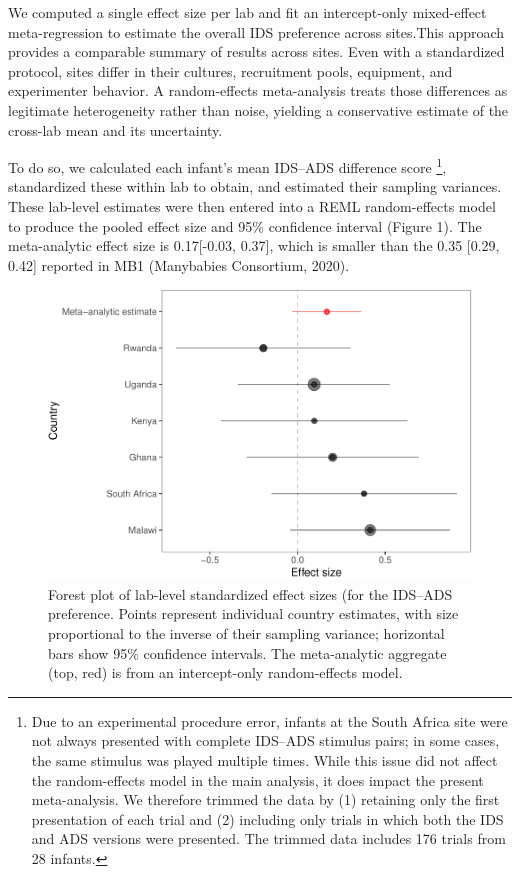 \documentclass[
  ,man,floatsintext]{apa6}
\begin{document}
We computed a single effect size per lab and fit an intercept-only mixed-effect meta-regression to estimate the overall IDS preference across sites.This approach provides a comparable summary of results across sites. Even with a standardized protocol, sites differ in their cultures, recruitment pools, equipment, and experimenter behavior. A random-effects meta-analysis treats those differences as legitimate heterogeneity rather than noise, yielding a conservative estimate of the cross-lab mean and its uncertainty.

To do so, we calculated each infant's mean IDS--ADS difference score \footnote{ Due to an experimental procedure error, infants at the South Africa site were not always presented with complete IDS--ADS stimulus pairs; in some cases, the same stimulus was played multiple times. While this issue did not affect the random-effects model in the main analysis, it does impact the present meta-analysis. We therefore trimmed the data by (1) retaining only the first presentation of each trial and (2) including only trials in which both the IDS and ADS versions were presented. The trimmed data includes 176 trials from 28 infants.}, standardized these within lab to obtain, and estimated their sampling variances. These lab-level estimates were then entered into a REML random-effects model to produce the pooled effect size and 95\% confidence interval (Figure 1). The meta-analytic effect size is 0.17{[}-0.03, 0.37{]}, which is smaller than the 0.35 {[}0.29, 0.42{]} reported in MB1 (Manybabies Consortium, 2020).

\begin{figure}
\centering
\includegraphics{mb1a-paper_files/figure-latex/unnamed-chunk-28-1.pdf}
\caption{\label{fig:unnamed-chunk-28}Forest plot of lab-level standardized effect sizes (for the IDS--ADS preference. Points represent individual country estimates, with size proportional to the inverse of their sampling variance; horizontal bars show 95\% confidence intervals. The meta-analytic aggregate (top, red) is from an intercept-only random-effects model.}
\end{figure}
\end{document}
